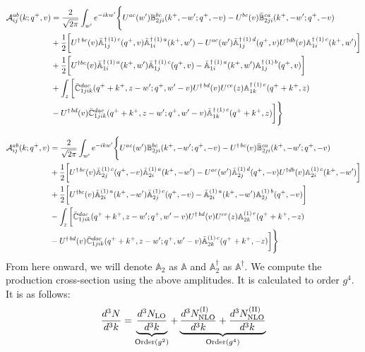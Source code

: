 \documentclass[aps,prd,amsmath,amssymb,nofootinbib]{revtex4-2}
\def\mf#1{\mathbb{#1}}
\numberwithin{equation}{section}
\begin{document}
\begin{align}
     {\cal A}^{ab}_{ij}(k; q^+, v) & = \frac{2}{\sqrt{2\pi}} \int_{w^{\prime}}e^{-i k w^\prime}\Bigg\{U^{ac}(w^{\prime}) \mf{B}^{bc}_{2ji}(k^{+},-w^{\prime};q^{+},-v)-U^{bc}(v)\Bar{\mf{B}}^{ca}_{2ji}(k^{+},-w^{\prime}; q^{+},-v)\notag \\ & +\frac{1}{2}\bigg[U^{\dagger\, bc}(v)\Bar{\mf{A}}^{\dagger\,(1)\, c}_{1j}(q^{+},v)\Bar{\mf{A}}^{\dagger\,(1)\, a}_{1i}(k^{+},w^{\prime})-U^{ac}(w^{\prime}) \Bar{\mf{A}}^{\dagger\,(1)\, d}_{1j}(q^{+},v)U^{\dagger db}(v) \mf{A}^{\dagger\,(1)\, c}_{1i}(k^{+},w^{\prime})\bigg]\notag \\ & +\frac{1}{2}\bigg[U^{\dagger bc}(v)\Bar{\mf{A}}^{\dagger\, (1)\, a}_{1i}(k^{+},w^{\prime})\Bar{\mf{A}}^{\dagger \, (1)\, c}_{1j}(q^{+},v)-\Bar{\mf{A}}^{\dagger\,(1)\, a}_{1i}(k^{+},w^{\prime}) \mf{A}^{\dagger\,(1)\, b}_{1j}(q^{+},v)\bigg]\notag \\ & +\int_{z}\bigg[\Bar{\mf{C}}^{dac}_{1jik}(q^{+}+k^{+},z-w^{\prime}; q^{+},w^{\prime}-v)U^{\dagger\, bd}(v)U^{ce}(z) \mf{A}^{\dagger\,(1)\,e}_{1k}(q^{+}+k^{+},z)\notag \\ &-U^{\dagger\, bd}(v) \Bar{\mf{C}}^{dac}_{1jik}(q^{+}+k^{+},z-w^{\prime}; q^{+},w^{\prime}-v)\Bar{\mf{A}}^{\dagger\,(1)\,c}_{1k}(q^{+}+k^{+},z)\bigg]\Bigg\}
\end{align}

\begin{align}
     {\cal A}^{ab}_{ij}(k; q^+, v) & = \frac{2}{\sqrt{2\pi}} \int_{w^{\prime}}e^{-i k w^\prime}\Bigg\{U^{ac}(w^{\prime}) \mf{B}^{bc}_{2ji}(k^{+},-w^{\prime};q^{+},-v)-U^{\dagger\, bc}(v)\Bar{\mf{B}}^{ca}_{2ji}(k^{+},-w^{\prime}; q^{+},-v)\notag \\ & +\frac{1}{2}\bigg[U^{\dagger\, bc}(v)\Bar{\mf{A}}^{(1)\, c}_{2j}(q^{+},-v)\Bar{\mf{A}}^{(1)\, a}_{2i}(k^{+},-w^{\prime})-U^{ac}(w^{\prime}) \Bar{\mf{A}}^{(1)\, d}_{2j}(q^{+},-v)U^{\dagger db}(v) \mf{A}^{(1)\, c}_{2i}(k^{+},- w^{\prime})\bigg]\notag \\ & +\frac{1}{2}\bigg[U^{\dagger bc}(v)\Bar{\mf{A}}^{(1)\, a}_{2i}(k^{+},- w^{\prime})\Bar{\mf{A}}^{(1)\, c}_{2j}(q^{+},-v)-\Bar{\mf{A}}^{(1)\, a}_{2i}(k^{+},- w^{\prime}) \mf{A}^{(1)\, b}_{2j}(q^{+},- v)\bigg]\notag \\ & -\int_{z}\bigg[\Bar{\mf{C}}^{dac}_{1jik}(q^{+}+k^{+},z-w^{\prime}; q^{+},w^{\prime}-v)U^{\dagger\, bd}(v)U^{ce}(z) \mf{A}^{(1)\,e}_{2k}(q^{+}+k^{+},-z)\notag \\ &-U^{\dagger\, bd}(v) \Bar{\mf{C}}^{dac}_{1jik}(q^{+}+k^{+},z-w^{\prime}; q^{+},w^{\prime}-v)\Bar{\mf{A}}^{(1)\,c}_{2k}(q^{+}+k^{+},-z)\bigg]\Bigg\}
\end{align}
From here onward, we will denote $\mf{A}_{2}$ as $\mf{A}$ and $\mf{A}^{\dagger}_{2}$ as $\mf{A}^{\dagger}$. We compute the production cross-section using the above amplitudes. It is calculated to order $g^{4}$. It is as follows:
\begin{align}
    \frac{d^{3}N}{d^{3}k} = 
     \underbrace{\frac{d^{3}N_{\rm LO}}{d^{3}k}}_{\text{Order}(g^{2})}
     + 
    \underbrace{ \frac{d^{3}N_{\rm NLO}^{\rm (I)}}{d^{3}k}
     + \frac{d^{3}N_{\rm NLO}^{\rm (II)}}{d^{3}k}}_{\text{Order}(g^{4})}
\end{align}
\end{document}
